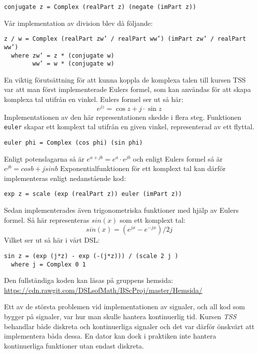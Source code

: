 \documentclass[]{article}
\begin{document}
\begin{verbatim}
conjugate z = Complex (realPart z) (negate (imPart z))
\end{verbatim}
Vår implementation av division blev då följande:
\begin{verbatim}
z / w = Complex (realPart zw’ / realPart ww’) (imPart zw’ / realPart ww’)
  where zw’ = z * (conjugate w)
        ww’ = w * (conjugate w)
\end{verbatim}

En viktig förutsättning för att kunna koppla de komplexa talen till kursen TSS var att man först
implementerade Eulers formel, som kan användas för att skapa komplexa tal utifrån en vinkel. Eulers
formel ser ut så här:
\[e^{jz}=\cos z+ j \cdot \sin z \]
Implementationen av den här representationen skedde i flera steg.
Funktionen \texttt{euler} skapar ett komplext tal utifrån en
given vinkel, representerad av ett flyttal.
\begin{verbatim}
euler phi = Complex (cos phi) (sin phi)
\end{verbatim}
Enligt potenslagarna%
så är \(e^{a+jb} = e^{a} \cdot e^{jb}\) och enligt Eulers formel så är
\(e^{j b} = cos b + j\dot sin b\) Exponentialfunktionen för ett komplext tal kan
därför implementeras enligt nedanstående kod:

\begin{verbatim}
exp z = scale (exp (realPart z)) euler (imPart z))
\end{verbatim}
Sedan implementerades även trigonometriska funktioner med hjälp av Eulers
formel. Så här representeras $sin(x)$ som ett komplext tal:
\[ sin(x) = (e^{j x} - e^{-j x}) / 2 j \]
Vilket ser ut så här i vårt DSL:
\begin{verbatim}
sin z = (exp (j*z) - exp (-(j*z))) / (scale 2 j )
  where j = Complex 0 1
\end{verbatim}

Den fullständiga koden kan läsas på gruppens hemsida:
\url{https://cdn.rawgit.com/DSLsofMath/BScProj/master/Hemsida/}

Ett av de största problemen vid implementationen av signaler, och all kod som bygger på signaler, var hur man
skulle hantera kontinuerlig tid. Kursen \textit{TSS} behandlar både diskreta och kontinuerliga signaler och det var
därför önskvärt att implementera båda dessa. En dator kan dock i praktiken inte hantera kontinuerliga funktioner utan
endast diskreta.
\end{document}
